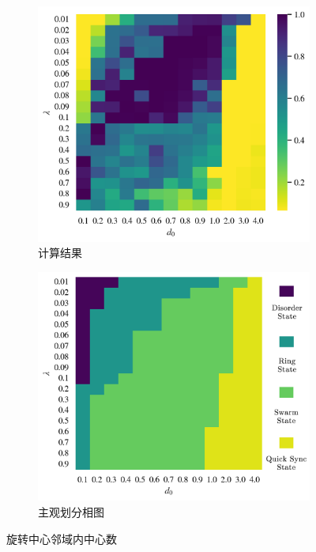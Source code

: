 \documentclass{article}
\begin{document}
\vspace{-0.5cm}
\begin{figure}[H]
	\centering
	\begin{subfigure}[b]{0.49\textwidth}
		\includegraphics[width=\textwidth]{./figs/nearbyNums.png}
		\vspace{-1cm}
		\caption{计算结果}
		
	\end{subfigure}
	\begin{subfigure}[b]{0.49\textwidth}
		\includegraphics[width=\textwidth]{./figs/subjectiveOp.png}
		\vspace{-1cm}
		\caption{主观划分相图}
	\end{subfigure}
	\vspace{-0.5cm}
	\caption{旋转中心邻域内中心数}
	\label{fig:fig234c.7.1}
\end{figure}
\end{document}
